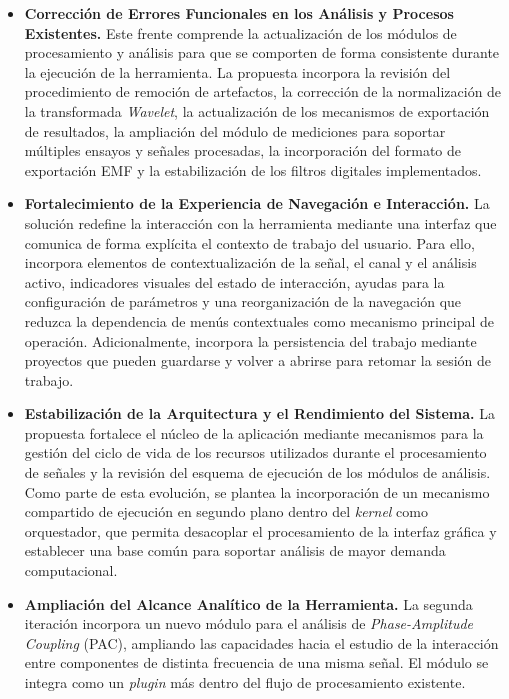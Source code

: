 \documentclass[12pt,letterpaper,oneside]{article}
\begin{document}
\begin{itemize}
  \item \textbf{Corrección de Errores Funcionales en los Análisis y Procesos Existentes.} Este frente comprende la actualización de los módulos de procesamiento y análisis para que se comporten de forma consistente durante la ejecución de la herramienta. La propuesta incorpora la revisión del procedimiento de remoción de artefactos, la corrección de la normalización de la transformada \textit{Wavelet}, la actualización de los mecanismos de exportación de resultados, la ampliación del módulo de mediciones para soportar múltiples ensayos y señales procesadas, la incorporación del formato de exportación EMF y la estabilización de los filtros digitales implementados.

  \item \textbf{Fortalecimiento de la Experiencia de Navegación e Interacción.} La solución redefine la interacción con la herramienta mediante una interfaz que comunica de forma explícita el contexto de trabajo del usuario. Para ello, incorpora elementos de contextualización de la señal, el canal y el análisis activo, indicadores visuales del estado de interacción, ayudas para la configuración de parámetros y una reorganización de la navegación que reduzca la dependencia de menús contextuales como mecanismo principal de operación. Adicionalmente, incorpora la persistencia del trabajo mediante proyectos que pueden guardarse y volver a abrirse para retomar la sesión de trabajo.

  \item \textbf{Estabilización de la Arquitectura y el Rendimiento del Sistema.} La propuesta fortalece el núcleo de la aplicación mediante mecanismos para la gestión del ciclo de vida de los recursos utilizados durante el procesamiento de señales y la revisión del esquema de ejecución de los módulos de análisis. Como parte de esta evolución, se plantea la incorporación de un mecanismo compartido de ejecución en segundo plano dentro del \textit{kernel} como orquestador, que permita desacoplar el procesamiento de la interfaz gráfica y establecer una base común para soportar análisis de mayor demanda computacional.

  \item \textbf{Ampliación del Alcance Analítico de la Herramienta.} La segunda iteración incorpora un nuevo módulo para el análisis de \textit{Phase-Amplitude Coupling} (PAC), ampliando las capacidades hacia el estudio de la interacción entre componentes de distinta frecuencia de una misma señal. El módulo se integra como un \textit{plugin} más dentro del flujo de procesamiento existente.
\end{itemize}
\end{document}
